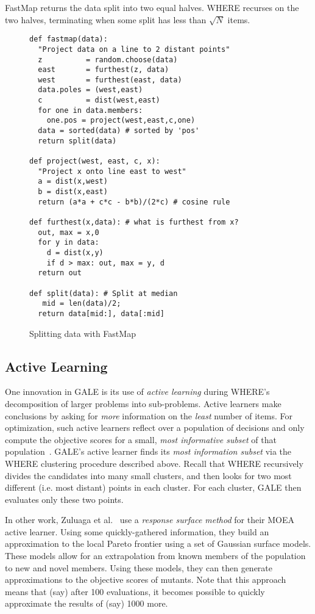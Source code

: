 \documentclass[10pt,journal,compsoc]{IEEEtran}
\begin{document}
FastMap returns the data split into two equal halves.
WHERE recurses on the two halves, terminating when some split has less than $\sqrt{N}$ items.


\begin{figure}[!t] 
\begin{minipage}{3.2in}
\begin{lstlisting}[mathescape,frame=r,numbers=right]
def fastmap(data): 
  "Project data on a line to 2 distant points"
  z          = random.choose(data)
  east       = furthest(z, data)
  west       = furthest(east, data)
  data.poles = (west,east)
  c          = dist(west,east)     
  for one in data.members: 
    one.pos = project(west,east,c,one)
  data = sorted(data) # sorted by 'pos'
  return split(data)

def project(west, east, c, x): 
  "Project x onto line east to west"
  a = dist(x,west)
  b = dist(x,east)
  return (a*a + c*c - b*b)/(2*c) # cosine rule

def furthest(x,data): # what is furthest from x?
  out, max = x,0
  for y in data:
    d = dist(x,y)
    if d > max: out, max = y, d
  return out

def split(data): # Split at median
   mid = len(data)/2; 
  return data[mid:], data[:mid]
\end{lstlisting}
\caption{Splitting data with FastMap}
\label{fig:fastmapCode}  
\end{minipage}
\end{figure}

\subsection{Active Learning}

One innovation in GALE is its use of  {\em active learning} during WHERE's decomposition of larger problems into sub-problems.
Active learners make conclusions by asking for {\em more} information on the {\em least} number of items.  
For optimization,  such active learners reflect over a population of decisions and only compute the objective scores for a small, {\em most informative subset} of that population~\cite{Zuluaga:13}. 
GALE's active learner finds its {\em most information subset} via the WHERE clustering procedure described above.
Recall that
WHERE recursively divides the candidates into many small clusters, and then looks for two most different (i.e. most distant) points in each cluster. 
For each cluster, GALE then evaluates only these two points. 

In other work, Zuluaga et al.~\cite{Zuluaga:13} use a {\em response surface method} for their MOEA active learner.  
Using some quickly-gathered information, they build an approximation to the local Pareto frontier using a set of Gaussian surface models. 
These models allow for an extrapolation from  known members of the
population to new and novel members.  
Using these models, they can then generate approximations to the objective scores of mutants. 
Note that this approach means that (say) after 100 evaluations, it becomes possible to quickly approximate the results of (say) 1000 more.
\end{document}
